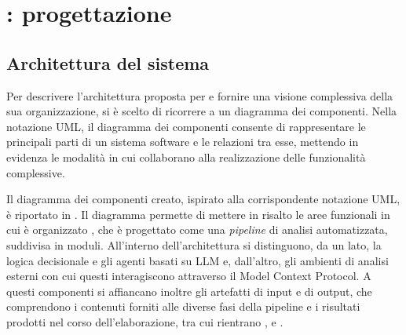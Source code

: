 \chapter{\system{}: progettazione} \label{chap:progettazione} %


\section{Architettura del sistema} %


Per descrivere l'architettura proposta per \system{} e fornire una visione complessiva della sua organizzazione, si è scelto di ricorrere a un diagramma dei componenti. Nella notazione UML, il diagramma dei componenti \cite{omg2017uml} consente di rappresentare le principali parti di un sistema software e le relazioni tra esse, mettendo in evidenza le modalità in cui collaborano alla realizzazione delle funzionalità complessive. %

Il diagramma dei componenti creato, ispirato alla corrispondente notazione UML, è riportato in . Il diagramma permette di mettere in risalto le aree funzionali in cui è organizzato \system{}, che è progettato come una \emph{pipeline} di analisi automatizzata, suddivisa in moduli. All'interno dell'architettura si distinguono, da un lato, la logica decisionale e gli agenti basati su LLM e, dall'altro, gli ambienti di analisi esterni con cui questi interagiscono attraverso il Model Context Protocol. A questi componenti si affiancano inoltre gli artefatti di input e di output, che comprendono i contenuti forniti alle diverse fasi della pipeline e i risultati prodotti nel corso dell'elaborazione, tra cui rientrano \binary{}, \kb{} e \capture{}.

